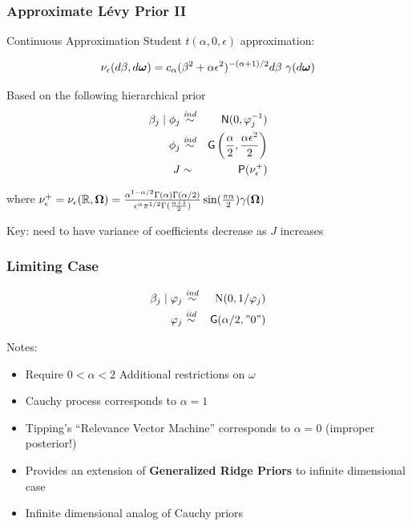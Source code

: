 \documentclass[]{beamer}
\newcommand{\bs}[2]{\begin{frame} \frametitle{#1}
{#2}
\end{frame} }
\begin{document}
\bs{Approximate L\'evy Prior II} {
Continuous Approximation Student $t(\alpha, 0, \epsilon)$ approximation:

$$\nu_\epsilon(d\beta, d \bm \omega) = c_\alpha (\beta^2 + \alpha
\epsilon^2)^{-(\alpha + 1)/2} d\beta \ \gamma(d \bm \omega) $$

\pause

Based on the following hierarchical prior
\begin{eqnarray*}
  \beta_j \mid \phi_j & \mathrel{\mathop{\sim}\limits^{\mathit{ind}}} & \textsf{N}(0,  \varphi_j^{-1}) \\
  \phi_j    & \mathrel{\mathop{\sim}\limits^{\mathit{ind}}} & \mbox{\sf G}\left(\frac{\alpha}{2}, \frac{\alpha \epsilon^2}{2}\right) \\
   J & \sim & \mbox{\sf P}(\nu^+_\epsilon)
\end{eqnarray*}

where $\nu^+_\epsilon = \nu_\epsilon(\mathbb{R}, \bm \Omega) = \frac{\alpha ^{1
    - \alpha/2} \Gamma(\alpha)\Gamma(\alpha/2)}{\epsilon^\alpha
  \pi^{1/2} \Gamma(\frac{\alpha +1}{2})} \sin(\frac{\pi \alpha} {2}) \gamma(\bm \Omega)$

Key:  need to have variance of coefficients decrease as $J$ increases
}

\bs{Limiting Case} {
  \begin{eqnarray*}
    \beta_j   \mid  \varphi_j & \mathrel{\mathop{\sim}\limits^{\mathit{ind}}} &\mbox{\rm N}(0, 1/\varphi_j) \\
      \varphi_j & \mathrel{\mathop{\sim}\limits^{\mathit{iid}}} & \mbox{\sf G}(\alpha/2, "0")
  \end{eqnarray*}
\pause

Notes:
  \begin{itemize}
\item Require $0 < \alpha < 2$  Additional restrictions  on $\omega$  \pause
\item  Cauchy process corresponds to $\alpha = 1$ \pause
\item  Tipping's ``Relevance Vector Machine'' corresponds to $\alpha =
  0$  (improper posterior!) \pause
\item Provides an extension of {\bf{Generalized Ridge Priors}}
      to infinite dimensional case \pause
\item Infinite dimensional analog of Cauchy priors
 \end{itemize}
}
\end{document}

